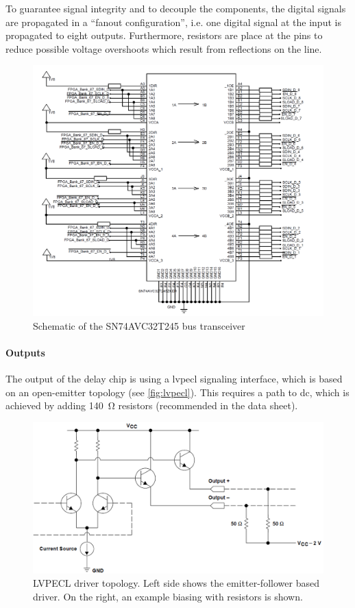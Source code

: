 To guarantee signal integrity and to decouple the components, the digital signals are propagated in a ``fanout configuration'', i.e. one digital signal at the input is propagated to eight outputs.
Furthermore, resistors are place at the pins to reduce possible voltage overshoots which result from reflections on the line. 
\begin{figure}[tb]
	\centering
	\includegraphics[width = \textwidth]{chap/04-theresa/img/schematic/level_trans}
	\caption[SN74AVC32T245 bus transceiver]{Schematic of the SN74AVC32T245 bus transceiver}
	\label{fig:level_trans}
\end{figure}

\paragraph{Outputs}
The output of the delay chip is using a \gls{lvpecl} signaling interface, which is based on an open-emitter topology (see \autoref{fig:lvpecl}).
This requires a path to \gls{dc}, which is achieved by adding \SI{140}{\ohm} resistors (recommended in the data sheet).

\begin{figure}[H]
	\centering
	\includegraphics[width = \textwidth]{chap/04-theresa/img/lvpecl}
	\caption[LVPECL driver topology]{LVPECL driver topology. Left side shows the emitter-follower based driver. On the right, an example biasing with resistors is shown. \cite{lvpecl}}
	\label{fig:lvpecl}
\end{figure}

